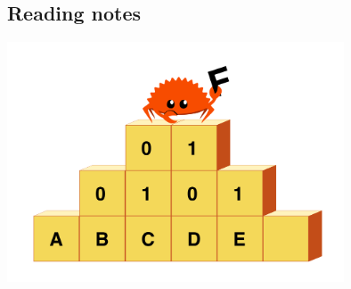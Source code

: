 \vspace*{2cm}
\thispagestyle{plain}

\begin{center}

{}

\section*{Reading notes}

\vspace*{1cm}
\includegraphics[width=10cm, angle=0, trim=10 10 10 10, clip]{images/ferris-climbing.png}

\end{center}

